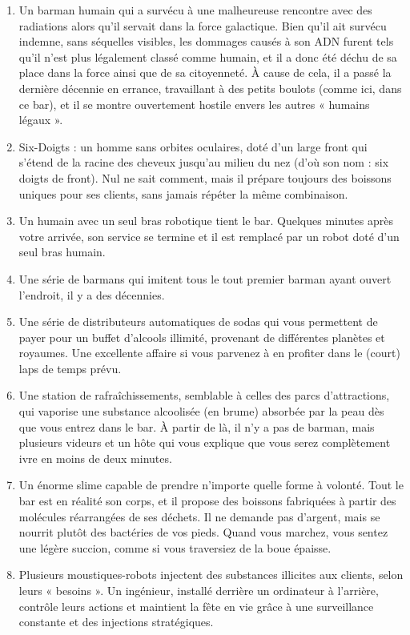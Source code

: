 \documentclass{article}
\begin{document}
\begin{enumerate}
	\item Un barman humain qui a survécu à une malheureuse rencontre avec des radiations alors qu’il servait dans la force galactique. Bien qu’il ait survécu indemne, sans séquelles visibles, les dommages causés à son ADN furent tels qu’il n’est plus légalement classé comme humain, et il a donc été déchu de sa place dans la force ainsi que de sa citoyenneté. À cause de cela, il a passé la dernière décennie en errance, travaillant à des petits boulots (comme ici, dans ce bar), et il se montre ouvertement hostile envers les autres « humains légaux ».
	\item Six-Doigts : un homme sans orbites oculaires, doté d’un large front qui s’étend de la racine des cheveux jusqu’au milieu du nez (d’où son nom : six doigts de front). Nul ne sait comment, mais il prépare toujours des boissons uniques pour ses clients, sans jamais répéter la même combinaison.
	\item Un humain avec un seul bras robotique tient le bar. Quelques minutes après votre arrivée, son service se termine et il est remplacé par un robot doté d’un seul bras humain.
	\item Une série de barmans qui imitent tous le tout premier barman ayant ouvert l’endroit, il y a des décennies.
	\item Une série de distributeurs automatiques de sodas qui vous permettent de payer pour un buffet d’alcools illimité, provenant de différentes planètes et royaumes. Une excellente affaire si vous parvenez à en profiter dans le (court) laps de temps prévu.
	\item Une station de rafraîchissements, semblable à celles des parcs d’attractions, qui vaporise une substance alcoolisée (en brume) absorbée par la peau dès que vous entrez dans le bar. À partir de là, il n’y a pas de barman, mais plusieurs videurs et un hôte qui vous explique que vous serez complètement ivre en moins de deux minutes.
	\item Un énorme slime capable de prendre n’importe quelle forme à volonté. Tout le bar est en réalité son corps, et il propose des boissons fabriquées à partir des molécules réarrangées de ses déchets. Il ne demande pas d’argent, mais se nourrit plutôt des bactéries de vos pieds. Quand vous marchez, vous sentez une légère succion, comme si vous traversiez de la boue épaisse.
	\item Plusieurs moustiques-robots injectent des substances illicites aux clients, selon leurs « besoins ». Un ingénieur, installé derrière un ordinateur à l’arrière, contrôle leurs actions et maintient la fête en vie grâce à une surveillance constante et des injections stratégiques.

\end{enumerate}
\end{document}
